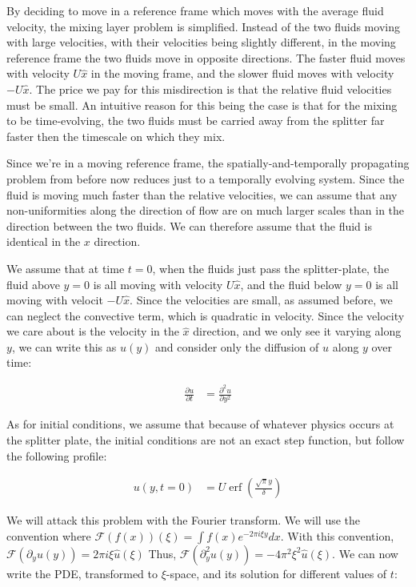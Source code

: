 \documentclass{article}
\DeclareMathOperator\erf{erf}
\begin{document}
By deciding to move in a reference frame which moves with the average fluid
	velocity, the mixing layer problem is simplified.
Instead of the two fluids moving with large velocities, with their velocities
	being slightly different, in the moving reference frame the two fluids 
	move in opposite directions.
The faster fluid moves with velocity $U\hat{x}$ in the moving
	frame, and the slower fluid moves with velocity $-U\hat{x}$.
The price we pay for this misdirection is that the relative fluid velocities
	must be small.
An intuitive reason for this being the case is that for the mixing
	to be time-evolving, the two fluids must be carried away from the
	splitter far faster then the timescale on which they mix.

Since we're in a moving reference frame, the spatially-and-temporally
	propagating problem from before now reduces just to a temporally
	evolving system.
Since the fluid is moving much faster than the relative velocities,
	we can assume that any non-uniformities along the direction
	of flow are on much larger scales than in the direction
	between the two fluids.
We can therefore assume that the fluid is identical in the $x$ 
	direction.

We assume that at time $t=0$, when the fluids just pass the splitter-plate,
	the fluid above $y=0$ is all moving with velocity $U \hat{x}$,
	and the fluid below $y=0$ is all moving with velocit $-U \hat{x}$.
Since the velocities are small, as assumed before, we can neglect the
	convective term, which is quadratic in velocity.
Since the velocity we care about is the velocity in the $\hat{x}$ direction,
	and we only see it varying along $y$, we can write this as 
	$u(y)$ and consider only the diffusion of $u$ along $y$ over time:

\begin{align}
\frac{\partial u}{\partial t} & = \frac{\partial^2 u}{\partial y^2}
\end{align}

As for initial conditions, we assume that because of whatever physics
	occurs at the splitter plate, the initial conditions are
	not an exact step function, but follow the following 
	profile:

\begin{align}
u(y,t=0) & = U \erf \left( \frac{ \sqrt{\pi} y}{\delta } \right)
\end{align}

We will attack this problem with the Fourier transform.
We will use the convention where $\mathcal{F}(f(x))(\xi) =
	 \int f(x) e^{-2 \pi i \xi y} dx$.
With this convention, $\mathcal{F} \left(\partial_y u(y)\right) 
	= 2\pi i \xi \hat{u}(\xi)$
Thus, $\mathcal{F} \left(\partial_y^2 u(y)\right) 
	= - 4 \pi^2 \xi^2 \hat{u}(\xi)$.
We can now write the PDE, transformed to $\xi$-space, and its solution
	for different values of $t$:
\end{document}

